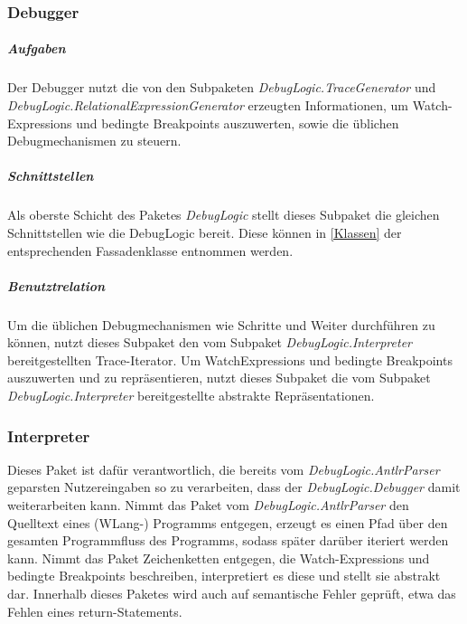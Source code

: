 \documentclass[parskip=full]{scrartcl}
\begin{document}
\subsubsection{Debugger}
\subparagraph{Aufgaben}
Der Debugger nutzt die von den Subpaketen \textit{DebugLogic.TraceGenerator} und \textit{DebugLogic.RelationalExpressionGenerator} erzeugten Informationen, um Watch-Expressions und bedingte Breakpoints auszuwerten, sowie die üblichen Debugmechanismen zu steuern.
\subparagraph{Schnittstellen}
Als oberste Schicht des Paketes \textit{DebugLogic} stellt dieses Subpaket die gleichen Schnittstellen wie die DebugLogic bereit. Diese können in \ref{Klassen} der entsprechenden Fassadenklasse entnommen werden.
\subparagraph{Benutztrelation} 


Um die üblichen Debugmechanismen wie Schritte und Weiter durchführen zu können, nutzt dieses Subpaket den vom Subpaket \textit{DebugLogic.Interpreter} bereitgestellten Trace-Iterator. 
Um WatchExpressions und bedingte Breakpoints auszuwerten und zu repräsentieren, nutzt dieses Subpaket die vom Subpaket \textit{DebugLogic.Interpreter} bereitgestellte abstrakte Repräsentationen.

\subsubsection{Interpreter}
Dieses Paket ist dafür verantwortlich, die bereits vom \textit{DebugLogic.AntlrParser}  geparsten Nutzereingaben so zu verarbeiten, dass der \textit{DebugLogic.Debugger} damit weiterarbeiten kann. Nimmt das Paket vom \textit{DebugLogic.AntlrParser} den Quelltext eines (WLang-) Programms entgegen, erzeugt es einen Pfad über den gesamten Programmfluss des Programms, sodass später darüber iteriert werden kann. Nimmt das Paket Zeichenketten entgegen, die Watch-Expressions und bedingte Breakpoints beschreiben, interpretiert es diese und stellt sie abstrakt dar.
Innerhalb dieses Paketes wird auch auf semantische Fehler geprüft, etwa das Fehlen eines return-Statements.
\end{document}
